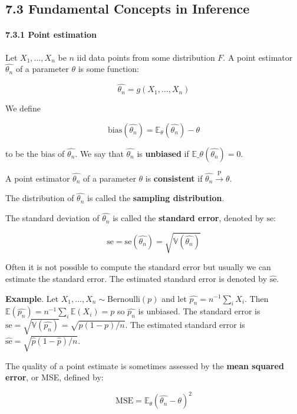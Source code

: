 \subsection*{7.3 Fundamental Concepts in
Inference}\label{fundamental-concepts-in-inference}

\paragraph{7.3.1 Point estimation}\label{point-estimation}

Let \(X_{1}, \dots, X_{n}\) be \(n\) iid data points from some distribution
\(F\). A point estimator \(\hat{\theta_{n}}\) of a parameter \(\theta\) is
some function:

\[ \hat{\theta_{n}} = g(X_{1}, \dots, X_{n}) \]

We define

\[ \text{bias}(\hat{\theta_{n}}) = \mathbb{E}_\theta(\hat{\theta_{n}}) - \theta \]

to be the bias of \(\hat{\theta_{n}}\). We say that \(\hat{\theta_{n}}\) is
\textbf{unbiased} if $ \mathbb{E}\_\theta(\hat{\theta_{n}}) = 0 $.

A point estimator \(\hat{\theta_{n}}\) of a parameter \(\theta\) is
\textbf{consistent} if \(\hat{\theta_{n}} \xrightarrow{\text{P}} \theta\).

The distribution of \(\hat{\theta_{n}}\) is called the \textbf{sampling
distribution}.

The standard deviation of \(\hat{\theta_{n}}\) is called the
\textbf{standard error}, denoted by \(\text{se}\):

\[ \text{se} = \text{se}(\hat{\theta_{n}}) = \sqrt{\mathbb{V}(\hat{\theta_{n}})} \]

Often it is not possible to compute the standard error but usually we
can estimate the standard error. The estimated standard error is denoted
by \(\hat{\text{se}}\).

\textbf{Example}. Let \(X_{1}, \dots, X_{n} \sim \text{Bernoulli}(p)\) and
let \(\hat{p_{n}} = n^{-1} \sum_{i} X_{i}\). Then
\(\mathbb{E}(\hat{p_{n}}) = n^{-1} \sum_{i} \mathbb{E}(X_{i}) = p\) so
\(\hat{p_{n}}\) is unbiased. The standard error is
\(\text{se} = \sqrt{\mathbb{V}(\hat{p_{n}})} = \sqrt{p(1-p)/n}\). The
estimated standard error is
\(\hat{\text{se}} = \sqrt{\hat{p}(1 - \hat{p})/n}\).

The quality of a point estimate is sometimes assessed by the
\textbf{mean squared error}, or MSE, defined by:

\[ \text{MSE} = \mathbb{E}_\theta \left( \hat{\theta_{n}} - \theta \right)^{2} \]

